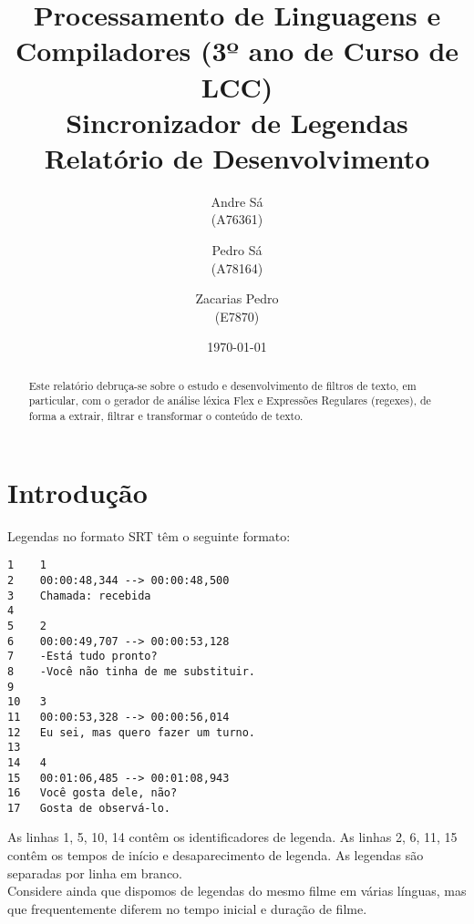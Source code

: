 \documentclass{report}
\title{Processamento de Linguagens e Compiladores (3º ano de Curso de LCC)\\ \textbf{Sincronizador de Legendas}\\ Relatório de Desenvolvimento}
\author{Andre Sá\\ (A76361) \and Pedro Sá\\ (A78164) \and Zacarias Pedro\\ (E7870) }
\date{\today}
\begin{document}
\maketitle

\begin{abstract}
Este relatório debruça-se sobre o estudo e desenvolvimento de filtros de texto, em particular, com o gerador de análise léxica Flex e Expressões Regulares (regexes), de forma a extrair, filtrar e transformar o conteúdo de texto.
\end{abstract}

\tableofcontents

\chapter{Introdução} \label{intro}
Legendas no formato SRT têm o seguinte formato:

\begin{verbatim}
1    1
2    00:00:48,344 --> 00:00:48,500
3    Chamada: recebida
4
5    2
6    00:00:49,707 --> 00:00:53,128
7    -Está tudo pronto?
8    -Você não tinha de me substituir.
9
10   3
11   00:00:53,328 --> 00:00:56,014
12   Eu sei, mas quero fazer um turno.
13
14   4
15   00:01:06,485 --> 00:01:08,943
16   Você gosta dele, não?
17   Gosta de observá-lo.
\end{verbatim}

As linhas 1, 5, 10, 14 contêm os identificadores de legenda. As linhas 2, 6, 11, 15 contêm os tempos de início e desaparecimento de legenda. As legendas são separadas por linha em branco.\\
Considere ainda que dispomos de legendas do mesmo filme em várias línguas, mas que frequentemente diferem no tempo inicial e duração de filme.
\end{document}
